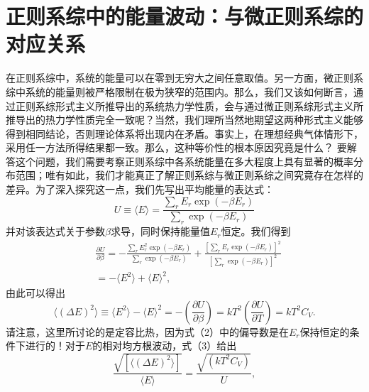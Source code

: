 \section{正则系综中的能量波动：与微正则系综的对应关系}\label{ux5e38ux6a21ux7cfbux4e2dux7684ux80fdux7ea7ux6ce2ux52a8ux4e0eux5faeux5206ux7cfbux7684ux5bf9ux5e94ux5173ux7cfb}
在正则系综中，系统的能量可以在零到无穷大之间任意取值。另一方面，微正则系综中系统的能量则被严格限制在极为狭窄的范围内。那么，我们又该如何断言，通过正则系综形式主义所推导出的系统热力学性质，会与通过微正则系综形式主义所推导出的热力学性质完全一致呢？当然，我们理所当然地期望这两种形式主义能够得到相同结论，否则理论体系将出现内在矛盾。事实上，在理想经典气体情形下，采用任一方法所得结果都一致。那么，这种等价性的根本原因究竟是什么？
要解答这个问题，我们需要考察正则系综中各系统能量在多大程度上具有显著的概率分布范围；唯有如此，我们才能真正了解正则系综与微正则系综之间究竟存在怎样的差异。为了深入探究这一点，我们先写出平均能量的表达式：
\begin{equation}\tag{3.5.22}\label{eq:3.5.22}
U \equiv \langle E \rangle = \frac { \sum _ { r } E _ { r } \exp ( - \beta E _ { r } ) } { \sum _ { r } \exp ( - \beta E _ { r } ) }
\end{equation}
并对该表达式关于参数\(\beta\)求导，同时保持能量值\(E_{r}\)恒定。我们得到
\begin{equation}\tag{3.5.23}\label{eq:3.5.23}
\begin{array}{rl} & { \frac { \partial U } { \partial \beta } = - \frac { \sum _ { r } E _ { r } ^{2} \exp ( - \beta E _ { r } ) } { \sum _ { r } \exp ( - \beta E _ { r } ) } + \frac { \left[ \sum _ { r } E _ { r } \exp ( - \beta E _ { r } ) \right] ^{2} } { \left[ \sum _ { r } \exp ( - \beta E _ { r } ) \right] ^{2} } } \\& { = - \langle E ^{2} \rangle + \langle E \rangle ^{2} , } \end{array}
\end{equation}
由此可以得出
\begin{equation}\tag{3.5.24}\label{eq:3.5.24}
\langle ( \Delta E ) ^{2} \rangle \equiv \langle E ^{2} \rangle - \langle E \rangle ^{2} = - \left( \frac { \partial U } { \partial \beta } \right) = k T ^{2} \left( \frac { \partial U } { \partial T } \right) = k T ^{2} C _ { V } .
\end{equation}
请注意，这里所讨论的是定容比热，因为式（2）中的偏导数是在\(E_{r}\)保持恒定的条件下进行的！对于\(E\)的相对均方根波动，式（3）给出
\begin{equation}\tag{3.5.25}\label{eq:3.5.25}
\frac { \sqrt { [ \langle ( \Delta E ) ^{2} \rangle ] } } { \langle E \rangle } = \frac { \sqrt { ( k T ^{2} C _ { V } ) } } { U } ,
\end{equation}
